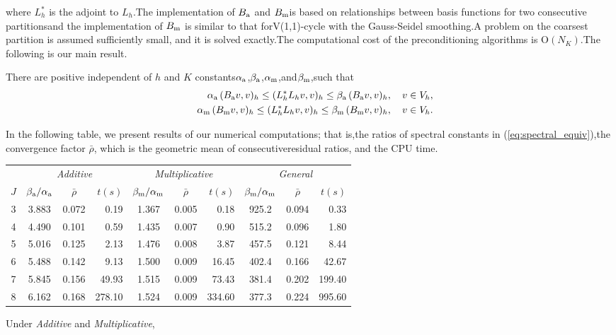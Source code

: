 \documentclass{report}
\begin{document}
where $L_h^*$ is the adjoint to $L_h$.The implementation of $B_{\textup{\scriptsize a}}$ and $B_{\textup{\scriptsize m}}$is based on relationships between basis functions for two consecutive partitionsand the implementation of $B_{\textup{\scriptsize m}}$ is similar to that forV(1,1)-cycle with the Gauss-Seidel smoothing.A problem on the coarsest partition is assumed sufficiently small,
and it is solved exactly.The computational cost of the preconditioning algorithms is $\mbox{O}(N_K)$.The following is our main result.\begin{theorem}There are positive independent of $h$ and $K$ constants$\alpha_{\textup{\scriptsize a}}$,$\beta_{\textup{\scriptsize a}}$,$\alpha_{\textup{\scriptsize m}}$,and$\beta_{\textup{\scriptsize m}}$,such that\begin{eqnarray}\label{eq:spectral_equiv}&&\alpha_{\textup{\scriptsize a}}\,
(B_{\textup{\scriptsize a}}v,v)_h\leq (L_h^*L_hv,v)_h \leq\beta_{\textup{\scriptsize a}}\,
(B_{\textup{\scriptsize a}}v,v)_h,\quad v\in V_h,\\\nonumber&&\alpha_{\textup{\scriptsize m}}\,
(B_{\textup{\scriptsize m}}v,v)_h\leq (L_h^*L_hv,v)_h \leq\beta_{\textup{\scriptsize m}}\,
(B_{\textup{\scriptsize m}}v,v)_h,\quad v\in V_h.\end{eqnarray}\end{theorem}In the following table,
we present results of our numerical computations;
that is,the ratios of spectral constants in (\ref{eq:spectral_equiv}),the convergence factor $\bar{\rho}$,
which is the geometric mean of consecutiveresidual ratios,
and the CPU time.\begin{center}\begin{tabular}{c|ccr|ccr|ccr}
& \multicolumn{3}{c|}{\textit{Additive}}
& \multicolumn{3}{c|}{\textit{Multiplicative}}&\multicolumn{3}{c}{\textit{General}}\\\cline{2-10}$J$
& $\beta_{\textrm{\scriptsize a}}/\alpha_{\textrm{\scriptsize a}}$
& $\bar{\rho}$
& $t(s)$
& $\beta_{\textrm{\scriptsize m}}/\alpha_{\textrm{\scriptsize m}}$
& $\bar{\rho}$
& $t(s)$
& $\beta_{\textrm{\scriptsize m}}/\alpha_{\textrm{\scriptsize m}}$
& $\bar{\rho}$
& $t(s)$\\\hline3
& 3.883
& 0.072
& 0.19
& 1.367
& 0.005
& 0.18
& 925.2
& 0.094
& 0.33\\4
& 4.490
& 0.101
& 0.59
& 1.435
& 0.007
& 0.90
& 515.2
& 0.096
& 1.80\\5
& 5.016
& 0.125
& 2.13
& 1.476
& 0.008
& 3.87
& 457.5
& 0.121
& 8.44\\6
& 5.488
& 0.142
& 9.13
& 1.500
& 0.009
& 16.45
& 402.4
& 0.166
& 42.67\\7
& 5.845
& 0.156
& 49.93
& 1.515
& 0.009
& 73.43
& 381.4
& 0.202
& 199.40\\8
& 6.162
& 0.168
& 278.10
& 1.524
& 0.009
& 334.60
& 377.3
& 0.224
& 995.60\end{tabular}\end{center}Under \textit{Additive} and \textit{Multiplicative},
\end{document}
